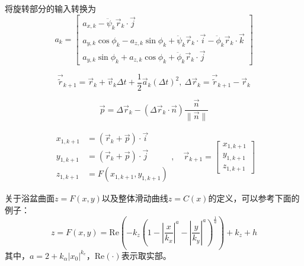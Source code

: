             将旋转部分的输入转换为
            \begin{equation}
            a_k = \begin{bmatrix} a_{x,k} - \ddot{\psi}_k \vec{r}_k \cdot \vec{j} \\ a_{y,k} \cos \phi_k - a_{z,k} \sin \phi_k + \ddot{\psi}_k \vec{r}_k \cdot \vec{i} - \ddot{\phi}_k \vec{r}_k \cdot \vec{k} \\ a_{y,k} \sin \phi_k + a_{z,k} \cos \phi_k + \ddot{\phi}_k \vec{r}_k \cdot \vec{j} \end{bmatrix}
            \end{equation}

            \begin{equation}
            \vec{\tilde{r}}_{k+1} = \vec{r}_k + \vec{v}_k \Delta t + \frac{1}{2} \vec{a}_k (\Delta t)^2, ~\Delta \vec{r}_k = \vec{\tilde{r}}_{k+1} - \vec{r}_k
            \end{equation}

            \begin{equation}
            \vec{p} = \Delta \vec{r}_k - (\Delta \vec{r}_k \cdot \vec{n}) \frac{\vec{n}}{\|\vec{n}\|}
            \end{equation}

            \begin{equation}
            \begin{aligned}
            x_{1,k+1} &= (\vec{r}_k + \vec{p}) \cdot \vec{i} \\
            y_{1,k+1} &= (\vec{r}_k + \vec{p}) \cdot \vec{j} \\
            z_{1,k+1} &= F(x_{1,k+1}, y_{1,k+1}) \end{aligned},\quad
            \vec{r}_{k+1} = \begin{bmatrix} x_{1,k+1} \\ y_{1,k+1} \\ z_{1,k+1} \end{bmatrix}
            \label{eq:stl_state}
            \end{equation}

            关于浴盆曲面$z = F(x,y)$以及整体滑动曲线$z = C(x)$的定义，可以参考下面的例子：
            \begin{equation}
            z = F(x,y) = \mathrm{Re}\left( -k_z \left( 1 - \left| \frac{x}{k_x} \right|^a - \left| \frac{y}{k_y} \right|^a \right)^{\frac{1}{a}} \right) + k_z + h
            \end{equation}
            \noindent 其中，$a = 2 + k_\alpha |x_0|^{k_e}$，$\mathrm{Re}(\cdot)$表示取实部。

